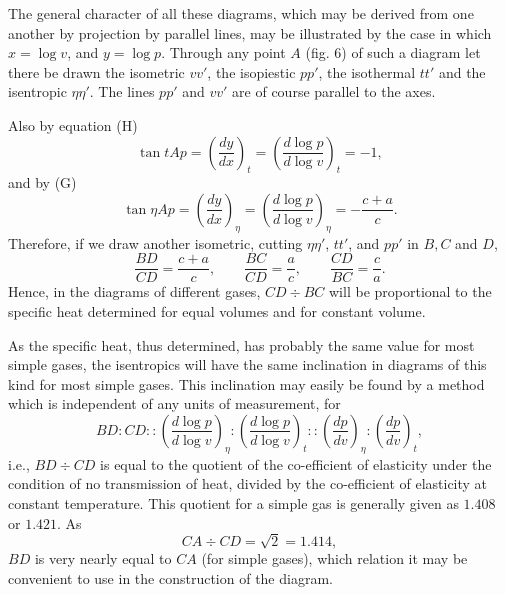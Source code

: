 \documentclass[11pt]{article}
\newcommand{\figlabel}[1]{\par\smallskip\centerline{\small #1}\smallskip}
\begin{document}
The general character of all these diagrams, which may be derived from one another by projection by parallel lines, may be illustrated by the case in which $x=\log v$, and $y=\log p$. Through any point $A$ (fig. 6) of such a diagram let there be drawn the isometric $vv'$, the isopiestic $pp'$, the isothermal $tt'$ and the isentropic $\eta\eta'$. The lines $pp'$ and $vv'$ are of course parallel to the axes.


\begin{center}
\end{center}


Also by equation (H)
\[
\tan tAp=\left(\frac{dy}{dx}\right)_t
=\left(\frac{d\log p}{d\log v}\right)_t=-1,
\]
and by (G)
\[
\tan\eta Ap=\left(\frac{dy}{dx}\right)_\eta
=\left(\frac{d\log p}{d\log v}\right)_\eta=-\frac{c+a}{c}.
\]
Therefore, if we draw another isometric, cutting $\eta\eta'$, $tt'$, and $pp'$ in $B,C$ and $D$,
\[
\frac{BD}{CD}=\frac{c+a}{c},\qquad
\frac{BC}{CD}=\frac{a}{c},\qquad
\frac{CD}{BC}=\frac{c}{a}.
\]
Hence, in the diagrams of different gases, $CD\div BC$ will be proportional to the specific heat determined for equal volumes and for constant volume.

As the specific heat, thus determined, has probably the same value for most simple gases, the isentropics will have the same inclination in diagrams of this kind for most simple gases. This inclination may easily be found by a method which is independent of any units of measurement, for
\[
BD:CD::\left(\frac{d\log p}{d\log v}\right)_\eta :
\left(\frac{d\log p}{d\log v}\right)_t ::
\left(\frac{dp}{dv}\right)_\eta :
\left(\frac{dp}{dv}\right)_t ,
\]
i.e., $BD\div CD$ is equal to the quotient of the co-efficient of elasticity under the condition of no transmission of heat, divided by the co-efficient of elasticity at constant temperature. This quotient for a simple gas is generally given as $1.408$ or $1.421$. As
\[
CA\div CD=\sqrt{2}=1.414,
\]
$BD$ is very nearly equal to $CA$ (for simple gases), which relation it may be convenient to use in the construction of the diagram.
\end{document}
